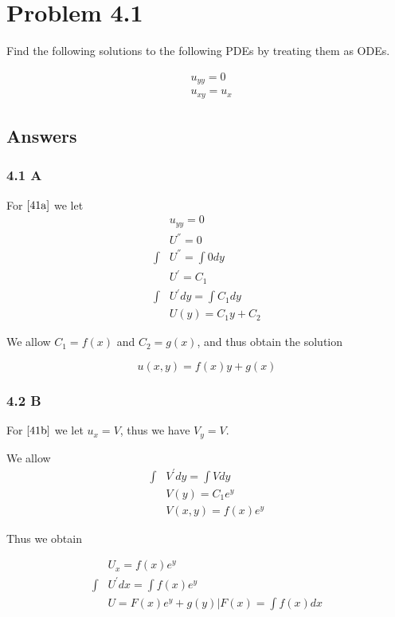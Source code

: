 \documentclass{article}
\begin{document}
\pagebreak
\section*{Problem 4.1}

Find the following solutions to the following PDEs by treating them as ODEs.

\begin{align}
&u_{yy}=0 \label{41a} \\
&u_{xy}=u_x \label{41b}
\end{align}

\subsection*{Answers}

\subsubsection*{4.1 A}

For $\eqref{41a}$ we let
\begin{align*}
&u_{yy}=0 \\
&U^{''} = 0\\
\int &U^{''} = \int 0 dy \\
&U^{'} = C_1 \\
\int &U^{'} dy = \int C_1 dy \\
&U(y) = C_1y + C_2
\end{align*}

We allow $C_1 = f(x)$ and $C_2 = g(x)$, and thus obtain the solution

$$ u(x,y) = f(x)y + g(x) $$

\subsubsection*{4.2 B}

For $\eqref{41b}$ we let $u_x = V$, thus we have $V_y = V$.

We allow
\begin{align*}
\int &V^{'} dy = \int V dy \\
&V\left(y\right) = C_1 e^{y} \\
&V\left(x,y\right) = f(x) e^{y}
\end{align*}

Thus we obtain

\begin{align*}
&U_x = f(x) e^{y} \\
\int &U^{'} dx = \int f(x) e^{y} \\
&U = F\left(x\right) e^{y} + g\left(y\right)\Bigr| F\left(x\right) = \int f\left(x\right) dx
\end{align*}
\end{document}
